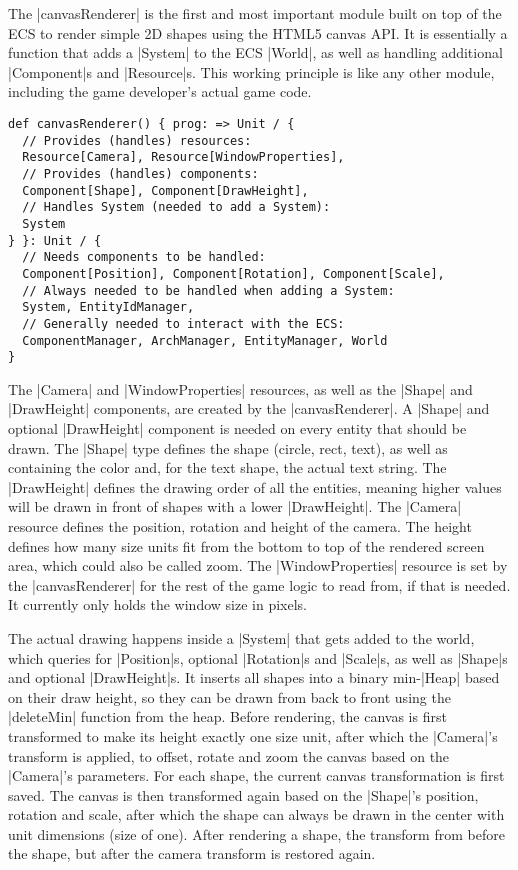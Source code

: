 The |canvasRenderer| is the first and most important module built on top of the ECS to render simple 2D shapes using the HTML5 canvas API. It is essentially a function that adds a |System| to the ECS |World|, as well as handling additional |Component|s and |Resource|s. This working principle is like any other module, including the game developer's actual game code.

\begin{lstlisting}[caption=canvasRenderer signature]
def canvasRenderer() { prog: => Unit / {
  // Provides (handles) resources:
  Resource[Camera], Resource[WindowProperties],
  // Provides (handles) components:
  Component[Shape], Component[DrawHeight],
  // Handles System (needed to add a System):
  System
} }: Unit / {
  // Needs components to be handled:
  Component[Position], Component[Rotation], Component[Scale],
  // Always needed to be handled when adding a System:
  System, EntityIdManager,
  // Generally needed to interact with the ECS:
  ComponentManager, ArchManager, EntityManager, World
}
\end{lstlisting}

The |Camera| and |WindowProperties| resources, as well as the |Shape| and |DrawHeight| components, are created by the |canvasRenderer|. A |Shape| and optional |DrawHeight| component is needed on every entity that should be drawn. The |Shape| type defines the shape (circle, rect, text), as well as containing the color and, for the text shape, the actual text string. The |DrawHeight| defines the drawing order of all the entities, meaning higher values will be drawn in front of shapes with a lower |DrawHeight|. The |Camera| resource defines the position, rotation and height of the camera. The height defines how many size units fit from the bottom to top of the rendered screen area, which could also be called zoom. The |WindowProperties| resource is set by the |canvasRenderer| for the rest of the game logic to read from, if that is needed. It currently only holds the window size in pixels.

The actual drawing happens inside a |System| that gets added to the world, which queries for |Position|s, optional |Rotation|s and |Scale|s, as well as |Shape|s and optional |DrawHeight|s. It inserts all shapes into a binary min-|Heap| based on their draw height, so they can be drawn from back to front using the |deleteMin| function from the heap. Before rendering, the canvas is first transformed to make its height exactly one size unit, after which the |Camera|'s transform is applied, to offset, rotate and zoom the canvas based on the |Camera|'s parameters. For each shape, the current canvas transformation is first saved. The canvas is then transformed again based on the |Shape|'s position, rotation and scale, after which the shape can always be drawn in the center with unit dimensions (size of one). After rendering a shape, the transform from before the shape, but after the camera transform is restored again.

